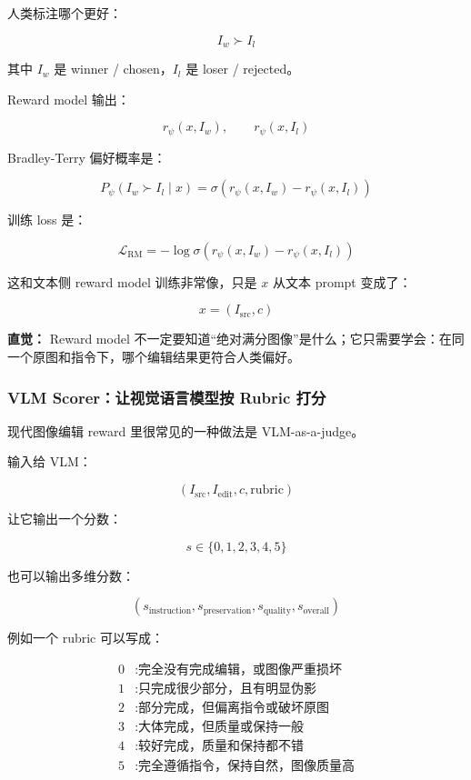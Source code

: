 人类标注哪个更好：

\[
I_w \succ I_l
\]

其中 $I_w$ 是 winner / chosen，$I_l$ 是 loser / rejected。

Reward model 输出：

\[
r_\psi(x,I_w),
\qquad
r_\psi(x,I_l)
\]

Bradley-Terry 偏好概率是：

\[
P_\psi(I_w\succ I_l\mid x)
=
\sigma
\left(
r_\psi(x,I_w)-r_\psi(x,I_l)
\right)
\]

训练 loss 是：

\[
\mathcal{L}_\text{RM}
=
-
\log
\sigma
\left(
r_\psi(x,I_w)-r_\psi(x,I_l)
\right)
\]

这和文本侧 reward model 训练非常像，只是 $x$ 从文本 prompt 变成了：

\[
x=(I_\text{src},c)
\]

\begin{intubox}
\textbf{直觉：} Reward model 不一定要知道“绝对满分图像”是什么；它只需要学会：在同一个原图和指令下，哪个编辑结果更符合人类偏好。
\end{intubox}

\subsubsection{VLM Scorer：让视觉语言模型按 Rubric 打分}

现代图像编辑 reward 里很常见的一种做法是 VLM-as-a-judge。

输入给 VLM：

\[
\left(
I_\text{src},
I_\text{edit},
c,
\text{rubric}
\right)
\]

让它输出一个分数：

\[
s\in\{0,1,2,3,4,5\}
\]

也可以输出多维分数：

\[
\left(
s_\text{instruction},
s_\text{preservation},
s_\text{quality},
s_\text{overall}
\right)
\]

例如一个 rubric 可以写成：

\[
\begin{array}{ll}
0 &: \text{完全没有完成编辑，或图像严重损坏} \\
1 &: \text{只完成很少部分，且有明显伪影} \\
2 &: \text{部分完成，但偏离指令或破坏原图} \\
3 &: \text{大体完成，但质量或保持一般} \\
4 &: \text{较好完成，质量和保持都不错} \\
5 &: \text{完全遵循指令，保持自然，图像质量高}
\end{array}
\]

